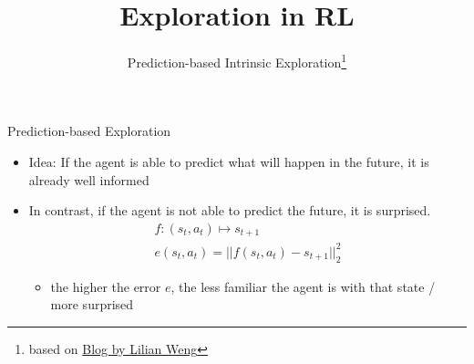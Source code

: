 


\title[RL: Exploration]{Exploration in RL}
\subtitle{Prediction-based Intrinsic Exploration\footnote{based on \href{https://lilianweng.github.io/lil-log/2020/06/07/exploration-strategies-in-deep-reinforcement-learning.html}{Blog by Lilian Weng}}}



	
	\maketitle


\begin{frame}[c]{Prediction-based Exploration~}
	
	\begin{itemize}
		\item Idea: If the agent is able to predict what will happen in the future, it is already well informed
		\item In contrast, if the agent is not able to predict the future, it is surprised.
		\begin{eqnarray}
		f: (s_t, a_t) \mapsto s_{t+1} \nonumber \\
		e(s_t, a_t) = || f(s_t, a_t) - s_{t+1}||_2^2\nonumber
		\end{eqnarray}
		\begin{itemize}
			\item the higher the error $e$, the less familiar the agent is with that state / more surprised
		\end{itemize}

	\end{itemize}

	
\end{frame}
